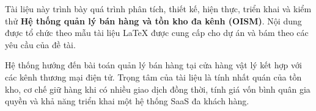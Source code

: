 Tài liệu này trình bày quá trình phân tích, thiết kế, hiện thực, triển khai và kiểm thử
\textbf{Hệ thống quản lý bán hàng và tồn kho đa kênh (OISM)}. Nội dung được tổ chức theo
mẫu tài liệu LaTeX được cung cấp cho dự án và bám theo các yêu cầu của đề tài.

Hệ thống hướng đến bài toán quản lý bán hàng tại cửa hàng vật lý kết hợp với các kênh
thương mại điện tử. Trọng tâm của tài liệu là tính nhất quán của tồn kho, cơ chế giữ hàng
khi có nhiều giao dịch đồng thời, tính giá vốn bình quân gia quyền và khả năng triển khai
một hệ thống SaaS đa khách hàng.



